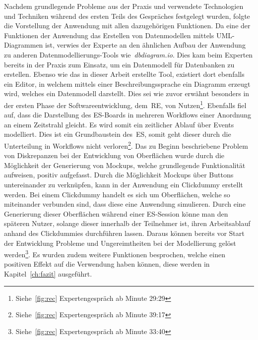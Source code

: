 Nachdem grundlegende Probleme aus der Praxis und verwendete Technologien und Techniken während des ersten Teils des Gespräches festgelegt wurden,
folgte die Vorstellung der Anwendung mit allen dazugehörigen Funktionen.
Da eine der Funktionen der Anwendung das Erstellen von Datenmodellen mittels UML-Diagrammen ist, verwies der Experte an den ähnlichen Aufbau der Anwendung
zu anderen Datenmodellierungs-Tools wie~\textit{dbdiagram.io}.
Dies kam beim Experten bereits in der Praxis zum Einsatz, um ein Datenmodell für Datenbanken zu erstellen.
Ebenso wie das in dieser Arbeit erstellte Tool, existiert dort ebenfalls ein Editor, in welchem mittels einer Beschreibungssprache ein Diagramm erzeugt wird,
welches ein Datenmodell darstellt.
Dies sei wie zuvor erwähnt besonders in der ersten Phase der Softwareentwicklung, dem~\ac{RE}, von Nutzen\footnote{Siehe~\ref{fig:rec} Expertengespräch ab Minute  29:29}.\newline
Ebenfalls fiel auf, dass die Darstellung des \ac{ES}-Boards in mehreren Workflows einer Anordnung an einem Zeitstrahl gleicht.
Es wird somit ein zeitlicher Ablauf über Events modelliert.
Dies ist ein Grundbaustein des~\ac{ES}, somit geht dieser durch die Unterteilung in Workflows nicht verloren\footnote{Siehe~\ref{fig:rec} Expertengespräch ab Minute  39:17}.\newline
Das zu Beginn beschriebene Problem von Diskrepanzen bei der Entwicklung von Oberflächen wurde durch die Möglichkeit der Generierung von
Mockups, welche grundlegende Funktionalität aufweisen, positiv aufgefasst.
Durch die Möglichkeit Mockups über Buttons untereinander zu verknüpfen, kann in der Anwendung ein Clickdummy erstellt werden.
Bei einem Clickdummy handelt es sich um Oberflächen, welche so miteinander verbunden sind, dass diese eine Anwendung simulieren.
Durch eine Generierung dieser Oberflächen während einer \ac{ES}-Session könne man den späteren Nutzer, solange dieser innerhalb der Teilnehmer ist,
ihren Arbeitsablauf anhand des Clickdummies durchführen lassen.
Daraus können bereits vor Start der Entwicklung Probleme und Ungereimtheiten bei der Modellierung gelöst werden\footnote{Siehe~\ref{fig:rec} Expertengespräch ab Minute  33:40}.\newline
Es wurden zudem weitere Funktionen besprochen, welche einen positiven Effekt auf die Verwendung haben können, diese werden in Kapitel~\ref{ch:fazit} ausgeführt.
